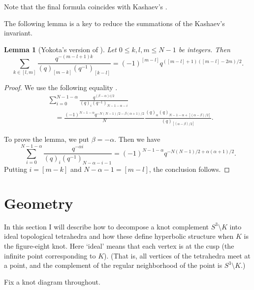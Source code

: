 \documentclass[a4paper]{amsart}
\theoremstyle{plain}
\newtheorem{lem}[thm]{Lemma}
\theoremstyle{definition}
\theoremstyle{remark}
\numberwithin{equation}{section}
\numberwithin{figure}{section}
\begin{document}
Note that the final formula coincides with Kashaev's
\cite[(2.2)]{Kashaev:LETMP97}.
\par
The following lemma is a key to reduce the summations of the Kashaev's
invariant.
\begin{lem}[Yokota's version of {\cite[Lemma~3.2]{Murakami/Murakami:volume}}]
Let $0\le{k},{l},{m}\le{N-1}$ be integers.
Then
\begin{equation*}
  \sum_{k\in[l,m]}
  \frac{q^{-(m-l+1)k}}{(q)_{[m-k]}(q^{-1})_{[k-l]}}
  =
  (-1)^{[m-l]}q^{([m-l]+1)([m-l]-2m)/2}.
\end{equation*}
\end{lem}
\begin{proof}
We use the following equality \cite[Lemma~3.2]{Murakami/Murakami:volume}.
\begin{equation*}
\begin{split}
  &\sum_{i=0}^{N-1-\alpha}
  \frac{q^{(\beta-\alpha)i/2}}{(q)_{i}(q^{-1})_{N-1-\alpha-i}}
  \\
  &\quad=\frac{(-1)^{N-1-\alpha}q^{-N(N-1)/2-\beta(\alpha+1)/2}}{N}
   \frac{(q)_{\alpha}(q)_{N-1-\alpha+[(\alpha-\beta)/2]}}
        {(q)_{[(\alpha-\beta)/2]}}.
\end{split}
\end{equation*}
\par
To prove the lemma, we put $\beta=-\alpha$.
Then we have
\begin{equation*}
  \sum_{i=0}^{N-1-\alpha}
  \frac{q^{-\alpha i}}{(q)_{i}(q^{-1})_{N-\alpha-i-1}}
  =
  (-1)^{N-1-\alpha}q^{-N(N-1)/2+\alpha(\alpha+1)/2}.
\end{equation*}
Putting $i=[m-k]$ and $N-\alpha-1=[m-l]$, the conclusion follows.
\end{proof}
\section{Geometry}\label{sec:geometry}
In this section I will describe how to decompose a knot complement
$S^3\setminus{K}$ into ideal topological tetrahedra and how these
define hyperbolic structure when $K$ is the figure-eight knot.
Here `ideal' means that each vertex is at the cusp (the infinite point
corresponding to $K$).
(That is, all vertices of the tetrahedra meet at a point, and the complement of
the regular neighborhood of the point is $S^3\setminus{K}$.)
\par
Fix a knot diagram throughout.
\end{document}
